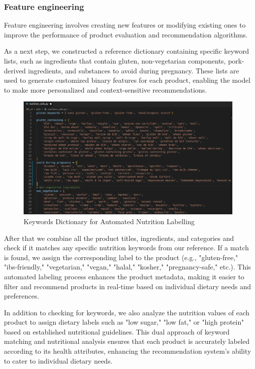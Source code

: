 \subsubsection{Feature engineering}
\par Feature engineering involves creating new features or modifying existing
ones to improve the performance of product evaluation and recommendation algorithms.

\par As a next step, we constructed a reference dictionary containing specific
keyword lists, such as ingredients that contain gluten, non-vegetarian
components, pork-derived ingredients, and substances to avoid during
pregnancy. These lists are used to generate customized binary features
for each product, enabling the model to make more personalized and
context-sensitive recommendations.

\begin{center}
\begin{figure}[H]
    \includegraphics[scale=0.45]{images/nutrition_utils.png}
    \caption{Keywords Dictionary for Automated Nutrition Labelling} 
    \label{fig:nutrition_utils_file}
\end{figure}
\end{center}

After that we combine all the product titles, ingredients, and categories
and check if it matches any specific nutrition keywords from our reference. If a match is found, we assign the corresponding label to the product (e.g., "gluten-free," "ibs-friendly," "vegetarian," "vegan," "halal," "kosher," "pregnancy-safe," etc.). This automated labeling process enhances the product metadata, making it easier to filter and recommend products in real-time based on individual dietary needs and preferences.

\par In addition to checking for keywords, we also analyze the nutrition values of each product to assign dietary labels such as "low sugar," "low fat," or "high protein" based on established nutritional guidelines. This dual approach of keyword matching and nutritional analysis ensures that each product is accurately labeled according to its health attributes, enhancing the recommendation system's ability to cater to individual dietary needs.

